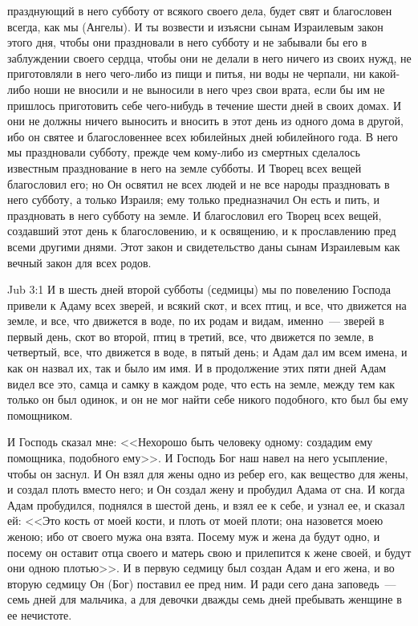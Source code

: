 празднующий в него субботу от всякого своего дела, будет свят и благословен
всегда, как мы (Ангелы). И ты возвести и изъясни сынам Израилевым закон этого
дня, чтобы они праздновали в него субботу и не забывали бы его в заблуждении
своего сердца, чтобы они не делали в него ничего из своих нужд, не приготовляли
в него чего-либо из пищи и питья, ни воды не черпали, ни какой-либо ноши не
вносили и не выносили в него чрез свои врата, если бы им не пришлось
приготовить себе чего-нибудь в течение шести дней в своих домах. И они не
должны ничего выносить и вносить в этот день из одного дома в другой, ибо он
святее и благословеннее всех юбилейных дней юбилейного года. В него мы
праздновали субботу, прежде чем кому-либо из смертных сделалось известным
празднование в него на земле субботы. И Творец всех вещей благословил его; но
Он освятил не всех людей и не все народы праздновать в него субботу, а
только Израиля; ему только предназначил Он есть и пить, и праздновать в него
субботу на земле. И благословил его Творец всех вещей, создавший этот день к
благословению, и к освящению, и к прославлению пред всеми другими днями.
Этот закон и свидетельство даны сынам Израилевым как вечный закон для
всех родов.

\vs Jub 3:1
И в шесть дней второй субботы (седмицы) мы по повелению Господа привели к
Адаму всех зверей, и всякий скот, и всех птиц, и все, что движется на земле, и
все, что движется в воде, по их родам и видам, именно~--- зверей в первый
день, скот во второй, птиц в третий, все, что движется по земле, в четвертый,
все, что движется в воде, в пятый день; и Адам дал им всем имена, и как он
назвал их, так и было им имя. И в продолжение этих пяти дней Адам видел все
это, самца и самку в каждом роде, что есть на земле, между тем как только он
был одинок, и он не мог найти себе никого подобного, кто был бы ему
помощником.

И Господь сказал мне: <<Нехорошо быть человеку одному: создадим ему
помощника, подобного ему>>. И Господь Бог наш навел на него усыпление,
чтобы он заснул. И Он взял для жены одно из ребер его, как вещество для жены, и
создал плоть вместо него; и Он создал жену и пробудил Адама от сна. И когда
Адам пробудился, поднялся в шестой день, и взял ее к себе, и узнал ее, и сказал
ей: <<Это кость от моей кости, и плоть от моей плоти; она назовется моею
женою; ибо от своего мужа она взята. Посему муж и жена да будут одно, и посему
он оставит отца своего и матерь свою и прилепится к жене своей, и будут они
одною плотью>>. И в первую седмицу был создан Адам и его жена, и во
вторую седмицу Он (Бог) поставил ее пред ним. И ради сего дана
заповедь~--- семь дней для мальчика, а для девочки дважды семь дней пребывать
женщине в ее нечистоте.

